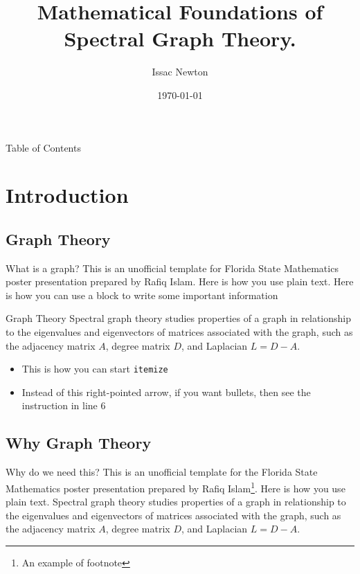 \documentclass{beamer}
\title[A short version of the title goes here]{Mathematical Foundations of Spectral Graph Theory.}
\author[Newton]{Issac Newton}
\institute{Florida State University}
\date{\today}
\begin{document}
\maketitle

\begin{frame}{Table of Contents}
\tableofcontents[subsectionstyle=hide, sectionstyle=show]
\end{frame}
\section{Introduction}
\subsection{Graph Theory}
\begin{frame}{What is a graph?}
    This is an unofficial template for Florida State Mathematics poster presentation prepared by Rafiq 
    Islam\cite{fsumathposter25}. Here is how you use plain text. Here is how you can use a block to write some important information \cite{fsubeamerpresent25}
    \begin{block}{Graph Theory}
        Spectral graph theory studies properties of a graph in relationship to the eigenvalues and eigenvectors of matrices associated with the graph, such as the adjacency matrix $A$, degree matrix $D$, and Laplacian $L = D - A$.
    \end{block}
   \begin{itemize}
    \item This is how you can start \texttt{itemize}
    \item Instead of this right-pointed arrow, if you want bullets, then see the instruction in line 6
\end{itemize}
\end{frame}
\subsection{Why Graph Theory}
\begin{frame}{Why do we need this?}
This is an unofficial template for the Florida State Mathematics poster presentation prepared by Rafiq Islam\footnote{An example of footnote}. Here is how you use plain text. Spectral graph theory studies properties of a graph in relationship to the eigenvalues and eigenvectors of matrices associated with the graph, such as the adjacency matrix $A$, degree matrix $D$, and Laplacian $L = D - A$.
\end{frame}
\end{document}
